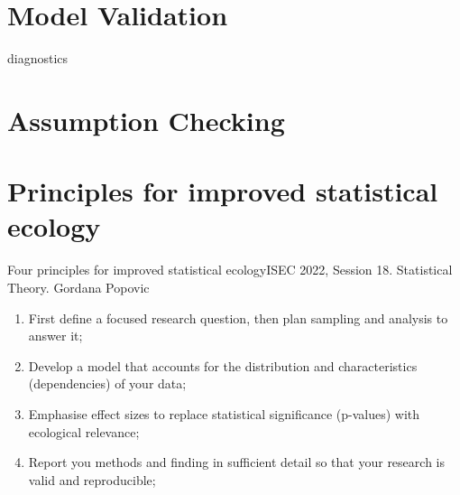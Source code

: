 \documentclass{beamer}
\begin{document}
\section{Model Validation}
diagnostics


\section{Assumption Checking}


\section{Principles for improved statistical ecology}

\begin{frame}{Four principles for improved statistical ecology}{ISEC 2022, Session 18. Statistical Theory. Gordana Popovic}

\begin{enumerate}
    \item First define a focused research question, then plan sampling and analysis to answer it; 
    \item Develop a model that accounts for the distribution and characteristics (dependencies) of your data;
    \item Emphasise effect sizes to replace statistical significance (p-values) with ecological relevance;
    \item Report you methods and finding in sufficient detail so that your research is valid and reproducible;
\end{enumerate}
\end{frame}
\end{document}
